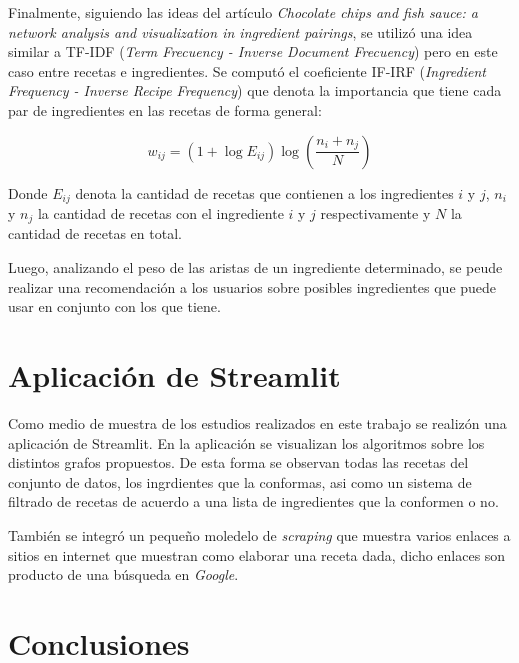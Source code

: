 \documentclass[a4paper]{article}
\begin{document}
Finalmente, siguiendo las ideas del artículo \emph{Chocolate chips and fish
sauce: a network analysis and visualization in ingredient
pairings}\cite{chocolate}, se utilizó una idea similar a TF-IDF (\emph{Term
Frecuency - Inverse Document Frecuency}) pero en este caso entre recetas e
ingredientes. Se computó el coeficiente IF-IRF (\emph{Ingredient Frequency -
Inverse Recipe Frequency}) que denota la importancia que tiene cada par de
ingredientes en las recetas de forma general:

$$w_{ij} = (1 + \log{E_{ij}})\log(\frac{n_i + n_j}{N})$$

Donde $E_{ij}$ denota la cantidad de recetas que contienen a los ingredientes
$i$ y $j$, $n_i$ y $n_j$ la cantidad de recetas con el ingrediente $i$ y $j$
respectivamente y $N$ la cantidad de recetas en total.

Luego, analizando el peso de las aristas de un ingrediente determinado, se peude
realizar una recomendación a los usuarios sobre posibles ingredientes que puede
usar en conjunto con los que tiene.

\section{Aplicación de Streamlit}\label{sec:app}

Como medio de muestra de los estudios realizados en este trabajo se realizón
una aplicación de Streamlit. En la aplicación se visualizan los algoritmos sobre
los distintos grafos propuestos. De esta forma se observan todas las recetas del
conjunto de datos, los ingrdientes que la conformas, asi como un sistema de
filtrado de recetas de acuerdo a una lista de ingredientes que la conformen o no.

También se integró un pequeño moledelo de \emph{scraping} que muestra varios
enlaces a sitios en internet que muestran como elaborar una receta dada, dicho
enlaces son producto de una búsqueda en \emph{Google}.

\section{Conclusiones}\label{sec:conc}
\end{document}
